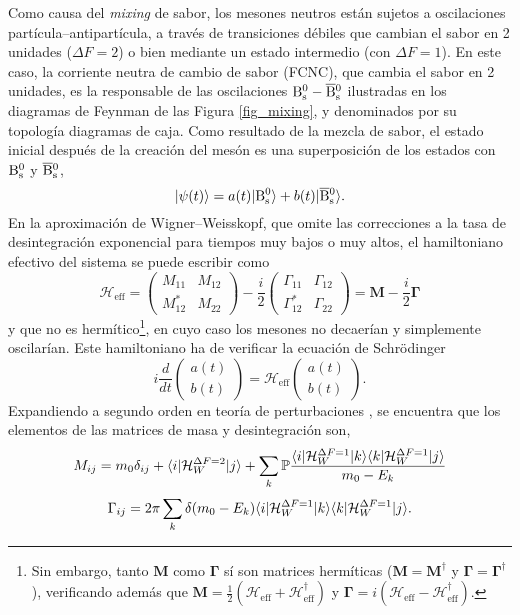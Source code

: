 Como causa del \emph{mixing} de sabor, los mesones neutros están sujetos a oscilaciones partícula--antipartícula, a través de transiciones débiles que cambian el sabor en 2 unidades ($\Delta F = 2$) o bien mediante un estado intermedio (con $\Delta F = 1$). En este caso, la corriente neutra de cambio de sabor (FCNC), que cambia el sabor en 2 unidades, es la responsable de las oscilaciones $\text{B}{}_{\text{s}}^{\text{0}} - \overline{\text{B}}{}_{\text{s}}^{\text{0}}$ ilustradas en los diagramas de Feynman de las Figura \ref{fig_mixing}, y denominados por su topología diagramas de caja. Como resultado de la mezcla de sabor, el estado inicial después de la creación del mesón es una superposición de los estados con $\text{B}{}_{\text{s}}^{\text{0}} $ y $\overline{\text{B}}{}_{\text{s}}^{\text{0}}$,
\[|\psi(t)\rangle = a(t) |\text{B}{}_{\text{s}}^{\text{0}}\rangle + b(t) |\overline{\text{B}}{}_{\text{s}}^{\text{0}}\rangle.\]
%
En la aproximación de Wigner--Weisskopf, que omite las correcciones a la tasa de desintegración exponencial para tiempos muy bajos
o muy altos, el hamiltoniano efectivo del sistema se puede escribir como 
\[\mathcal{H}_{\text{eff}} = \begin{pmatrix}
	M_{11} & M_{12} \\ M_{12}^* & M_{22}
\end{pmatrix} - \frac{i}{2} \begin{pmatrix}
	\Gamma_{11} & \Gamma_{12} \\ \Gamma_{12}^* & \Gamma_{22} 
\end{pmatrix} = \mathbf{M} - \frac{i}{2} \bm{\Gamma} \]
%
\noindent y que no es hermítico\footnote{Sin embargo, tanto $\mathbf{M}$ como $\bm{\Gamma}$ sí son matrices hermíticas ($\mathbf{M} = \mathbf{M}^{\dagger}$ y $\bm{\Gamma} = \bm{\Gamma}^{\dagger}$), verificando además que $\bm{M}=\frac{1}{2} (\mathcal{H}_{\text{eff}} + \mathcal{H}_{\text{eff}}^{\dagger})$ y $\bm{\Gamma} = i(\mathcal{H}_{\text{eff}}-\mathcal{H}_{\text{eff}}^{\dagger})$.}, en cuyo caso los mesones no decaerían y simplemente oscilarían. Este hamiltoniano ha de verificar la ecuación de Schrödinger
\[i \frac{d}{dt} \begin{pmatrix}
	a(t)  \\ b(t)
\end{pmatrix} = \mathcal{H}_{\text{eff}} \begin{pmatrix}
	a(t)   \\ b(t)  
\end{pmatrix}.\]
%
Expandiendo a segundo orden en teoría de perturbaciones \cite{lavoura}, se encuentra que los elementos de las matrices de masa y desintegración son, 
\[M_{ij} = m_0 \delta_{ij} + \langle i | \mathcal{H}_{W}^{\Delta F = 2} | j\rangle  + \sum_k \mathbb{P} \frac{\langle i | \mathcal{H}_{W}^{\Delta F = 1} | k\rangle \langle k | \mathcal{H}_{W}^{\Delta F = 1} | j \rangle }{m_0 - E_k}\]
\[\Gamma_{ij} = 2 \pi \sum_k \delta (m_0 - E_k) \langle i | \mathcal{H}_{W}^{\Delta F = 1} | k\rangle \langle k | \mathcal{H}_{W}^{\Delta F = 1} | j \rangle .\]

